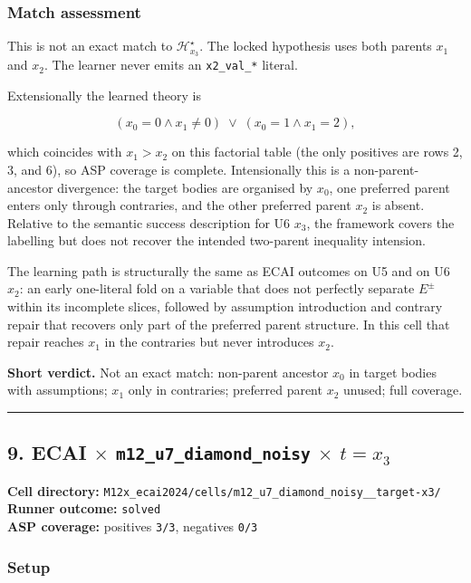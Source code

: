 \documentclass[11pt]{article}
\begin{document}
\subsubsection{Match assessment}

This is not an exact match to \(\mathcal{H}_{x_3}^\star\). The locked hypothesis uses both parents \(x_1\) and \(x_2\). The learner never emits an \texttt{x2\_val\_*} literal.

Extensionally the learned theory is

\[ (x_0=0 \land x_1\neq 0)\;\lor\;(x_0=1 \land x_1=2), \]

which coincides with \(x_1>x_2\) on this factorial table (the only positives are rows 2, 3, and 6), so ASP coverage is complete. Intensionally this is a non-parent-ancestor divergence: the target bodies are organised by \(x_0\), one preferred parent enters only through contraries, and the other preferred parent \(x_2\) is absent. Relative to the semantic success description for U6 \(x_3\), the framework covers the labelling but does not recover the intended two-parent inequality intension.

The learning path is structurally the same as ECAI outcomes on U5 and on U6 \(x_2\): an early one-literal fold on a variable that does not perfectly separate \(E^\pm\) within its incomplete slices, followed by assumption introduction and contrary repair that recovers only part of the preferred parent structure. In this cell that repair reaches \(x_1\) in the contraries but never introduces \(x_2\).

\textbf{Short verdict.} Not an exact match: non-parent ancestor \(x_0\) in target bodies with assumptions; \(x_1\) only in contraries; preferred parent \(x_2\) unused; full coverage.

\medskip\hrule\medskip

\subsection{\texorpdfstring{9. ECAI \(\times\) \texttt{m12\_u7\_diamond\_noisy} \(\times\) \(t=x_3\)}{9. ECAI - m12-u7-diamond-noisy - target x3}}

\textbf{Cell directory:} \texttt{M12x\_ecai2024/cells/m12\_u7\_diamond\_noisy\_\_target-x3/}\\
\textbf{Runner outcome:} \texttt{solved}\\
\textbf{ASP coverage:} positives \texttt{3/3}, negatives \texttt{0/3}

\subsubsection{Setup}
\end{document}
